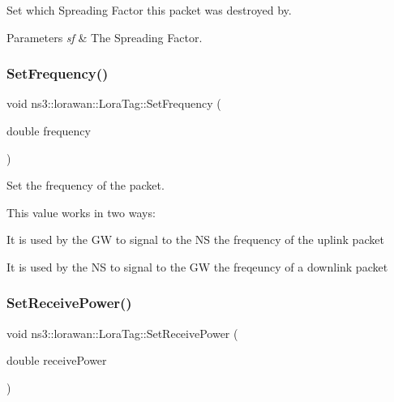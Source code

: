 Set which Spreading Factor this packet was destroyed by.


\begin{DoxyParams}{Parameters}
{\em sf} & The Spreading Factor. \\
\hline
\end{DoxyParams}
\mbox{\label{classns3_1_1lorawan_1_1LoraTag_a9c6da5747bb782ee78f0edd91775ab1b}} 
\subsubsection{\texorpdfstring{Set\+Frequency()}{SetFrequency()}}
{\footnotesize\ttfamily void ns3\+::lorawan\+::\+Lora\+Tag\+::\+Set\+Frequency (\begin{DoxyParamCaption}\item[{double}]{frequency }\end{DoxyParamCaption})}

Set the frequency of the packet.

This value works in two ways\+:
\begin{DoxyItemize}
\item It is used by the GW to signal to the NS the frequency of the uplink packet
\item It is used by the NS to signal to the GW the freqeuncy of a downlink packet 
\end{DoxyItemize}\mbox{\label{classns3_1_1lorawan_1_1LoraTag_ac13d46d936c4da9814ab6fb113f9fc64}} 
\subsubsection{\texorpdfstring{Set\+Receive\+Power()}{SetReceivePower()}}
{\footnotesize\ttfamily void ns3\+::lorawan\+::\+Lora\+Tag\+::\+Set\+Receive\+Power (\begin{DoxyParamCaption}\item[{double}]{receive\+Power }\end{DoxyParamCaption})}

